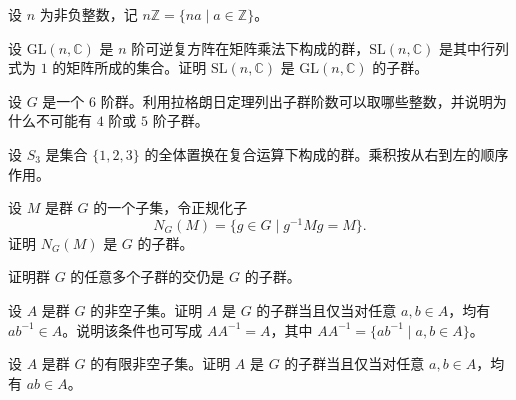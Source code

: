 \noindent\begin{minipage}{\textwidth}
设 $n$ 为非负整数，记 $n\mathbb{Z}=\{na\mid a\in\mathbb{Z}\}$。
\end{minipage}\par\vfill
\noindent\begin{minipage}{\textwidth}
设 $\mathrm{GL}(n,\mathbb{C})$ 是 $n$ 阶可逆复方阵在矩阵乘法下构成的群，$\mathrm{SL}(n,\mathbb{C})$ 是其中行列式为 $1$ 的矩阵所成的集合。证明 $\mathrm{SL}(n,\mathbb{C})$ 是 $\mathrm{GL}(n,\mathbb{C})$ 的子群。
\end{minipage}\par\vfill
\newpage
\noindent\begin{minipage}{\textwidth}
设 $G$ 是一个 $6$ 阶群。利用拉格朗日定理列出子群阶数可以取哪些整数，并说明为什么不可能有 $4$ 阶或 $5$ 阶子群。
\end{minipage}\par\vfill
\noindent\begin{minipage}{\textwidth}
设 $S_3$ 是集合 $\{1,2,3\}$ 的全体置换在复合运算下构成的群。乘积按从右到左的顺序作用。
\end{minipage}\par\vfill
\noindent\begin{minipage}{\textwidth}
设 $M$ 是群 $G$ 的一个子集，令正规化子
\[
N_G(M)=\{g\in G\mid g^{-1}Mg=M\}.
\]
证明 $N_G(M)$ 是 $G$ 的子群。
\end{minipage}\par\vfill
\newpage
\noindent\begin{minipage}{\textwidth}
证明群 $G$ 的任意多个子群的交仍是 $G$ 的子群。
\end{minipage}\par\vfill
\noindent\begin{minipage}{\textwidth}
设 $A$ 是群 $G$ 的非空子集。证明 $A$ 是 $G$ 的子群当且仅当对任意 $a,b\in A$，均有 $ab^{-1}\in A$。说明该条件也可写成 $AA^{-1}=A$，其中 $AA^{-1}=\{ab^{-1}\mid a,b\in A\}$。
\end{minipage}\par\vfill
\noindent\begin{minipage}{\textwidth}
设 $A$ 是群 $G$ 的有限非空子集。证明 $A$ 是 $G$ 的子群当且仅当对任意 $a,b\in A$，均有 $ab\in A$。
\end{minipage}\par\vfill
